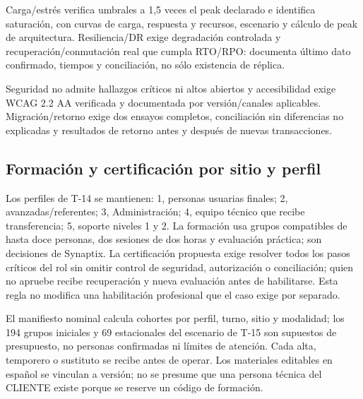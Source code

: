 Carga/estrés verifica umbrales a 1,5 veces el peak declarado e identifica saturación, con curvas de carga, respuesta y recursos, escenario y cálculo de peak de arquitectura. Resiliencia/DR exige degradación controlada y recuperación/conmutación real que cumpla RTO/RPO: documenta último dato confirmado, tiempos y conciliación, no sólo existencia de réplica.

Seguridad no admite hallazgos críticos ni altos abiertos y accesibilidad exige WCAG 2.2 AA verificada y documentada por versión/canales aplicables. Migración/retorno exige dos ensayos completos, conciliación sin diferencias no explicadas y resultados de retorno antes y después de nuevas transacciones. 

\subsection{Formación y certificación por sitio y perfil}
Los perfiles de T-14 se mantienen: 1, personas usuarias finales; 2, avanzadas/referentes; 3, Administración; 4, equipo técnico que recibe transferencia; 5, soporte niveles 1 y 2. La formación usa grupos compatibles de hasta doce personas, dos sesiones de dos horas y evaluación práctica; son decisiones de Synaptix. La certificación propuesta exige resolver todos los pasos críticos del rol sin omitir control de seguridad, autorización o conciliación; quien no apruebe recibe recuperación y nueva evaluación antes de habilitarse. Esta regla no modifica una habilitación profesional que el caso exige por separado.

El manifiesto nominal calcula cohortes por perfil, turno, sitio y modalidad; los 194 grupos iniciales y 69 estacionales del escenario de T-15 son supuestos de presupuesto, no personas confirmadas ni límites de atención. Cada alta, temporero o sustituto se recibe antes de operar. Los materiales editables en español se vinculan a versión; no se presume que una persona técnica del CLIENTE existe porque se reserve un código de formación.


